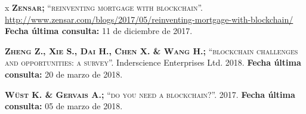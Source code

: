 \begin{thebibliography} {x}
	 \textsc{\textbf{Zensar; }} \textsc{“reinventing mortgage with blockchain”.}
	\url{http://www.zensar.com/blogs/2017/05/reinventing-mortgage-with-blockchain/}
	\newline \textbf{Fecha última consulta:} 11 de diciembre de 2017.
	
	 \textsc{\textbf{Zheng Z., Xie S., Dai H., Chen X. \& Wang H.; }} \textsc{“blockchain challenges and opportunities: a survey”.} Inderscience Enterprises Ltd. 2018.
	\newline \textbf{Fecha última consulta:} 20 de marzo de 2018.
	
	 \textsc{\textbf{Wüst K. \& Gervais A.; }} \textsc{“do you need a blockchain?”.} 2017.
	\newline \textbf{Fecha última consulta:} 05 de marzo de 2018.
		
	\endgroup
\end{thebibliography}